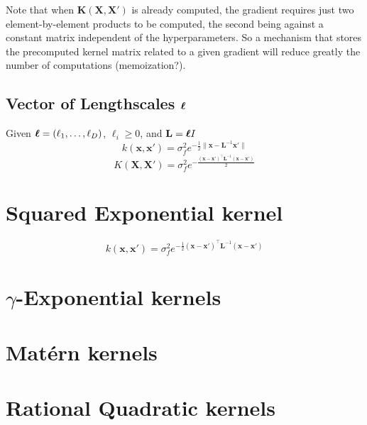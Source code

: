\documentclass[a4paper,11pt]{article}
\newcommand\x{{\mathbf x}}
\newcommand\X{{\mathbf X}}
\newcommand\K{{\mathbf K}}
\newcommand\LL{{\mathbf L}}
\newcommand{\Ivec}[1]{\mbox{\boldmath $#1$}}
\begin{document}
Note that when $\K(\X,\X')$ is already computed, the gradient requires
just two element-by-element products to be computed, the second being
against a constant matrix independent of the hyperparameters. So a
mechanism that stores the precomputed kernel matrix related to a given
gradient will reduce greatly the number of computations
(memoization?).

\subsection{Vector of Lengthscales $\Ivec{\ell}$}
Given $\Ivec{\ell} = (\ell_1,\ldots,\ell_D)$, $\ell_i \ge 0$, and $\LL
= \Ivec{\ell}I$
$$k(\x,\x') = \sigma_f^2 e^{-\frac{1}{2}\|\x-{\LL^{-1}\x'}\|}$$
$$K(\X,\X') = \sigma_f^2 e^{-\frac{(\x-\x')^{\top} \LL^{-1} (\x-\x')}{2}}$$


\section{Squared Exponential kernel}
$$k(\x,\x') = \sigma_f^2 e^{-\frac{1}{2}(\x-\x')^{\top} \LL^{-1} (\x-\x')}$$

\section{$\gamma$-Exponential kernels}

\section{Mat\'ern kernels}

\section{Rational Quadratic kernels}
\end{document}
